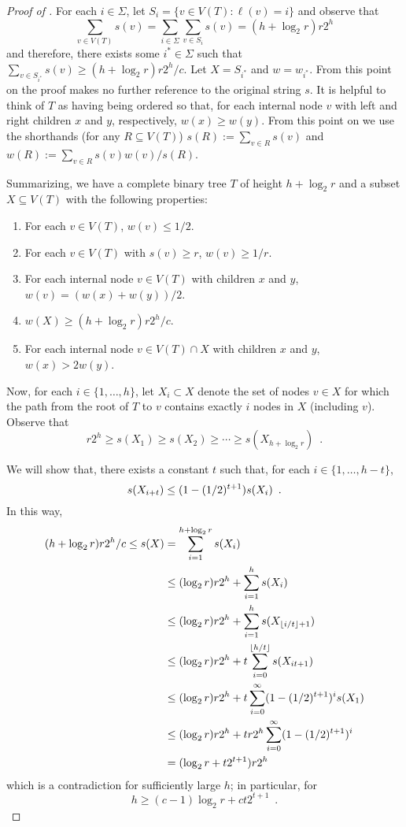 \documentclass{patmorin}
\begin{document}
\begin{proof}[Proof of ]
  For each $i\in\Sigma$, let $S_i=\{v\in V(T): \ell(v)=i\}$ and observe that 
  \[
      \sum_{v\in V(T)}s(v)=\sum_{i\in\Sigma} \sum_{v\in S_i} s(v) = (h+\log_2 r)r2^{h}
  \]
  and therefore, there exists some $i^*\in\Sigma$ such that $\sum_{v\in
  S_{i^*}}s(v)\ge (h+\log_2 r)r2^h/c$.  Let $X=S_{i^*}$ and $w=w_{i^*}$.
  From this point on the proof makes no further reference to the original
  string $s$.  It is helpful to think of $T$ as having being ordered
  so that, for each internal node $v$ with left and right children $x$
  and $y$, respectively, $w(x)\ge w(y)$.  From this point on we use
  the shorthands (for any $R\subseteq V(T)$) $s(R):=\sum_{v\in R}s(v)$
  and $w(R):=\sum_{v\in R}s(v)w(v)/s(R)$.

  Summarizing, we have a complete binary tree $T$ of height $h+\log_2 r$ and
  a subset $X\subseteq V(T)$ with the following properties: 
  \begin{enumerate}
    \item For each $v\in V(T)$, $w(v) \le 1/2$.
    \item For each $v\in V(T)$ with $s(v) \ge r$, $w(v)\ge 1/r$.
    \item For each internal node $v\in V(T)$ with children $x$ and $y$,
       $w(v) = (w(x)+w(y))/2$.
    \item $w(X) \ge (h+\log_2 r)r2^{h}/c$.
     \item For each internal node $v\in V(T)\cap X$ with children $x$ and $y$,
       $w(x) > 2w(y)$.
  \end{enumerate}
  Now, for each $i\in\{1,\ldots,h\}$, let $X_i\subset X$ denote the
  set of nodes $v\in X$ for which the path from the root of $T$ to $v$
  contains exactly $i$ nodes in $X$ (including $v$).  Observe that 
  \[  r2^h \ge s(X_1) \ge s(X_2) \ge \cdots\ge s(X_{h+\log_2 r}) \enspace . \]

  We will show that, there exists a constant $t$ such that, 
  for each $i\in\{1,\ldots,h-t\}$,  
  \begin{equation}
     s(X_{i+t}) \le (1-(1/2)^{t+1}) s(X_i) \enspace . \eqlabel{t}
  \end{equation}
  In this way, 
  \begin{align*}
     (h+\log_2 r)r2^{h}/c 
        \le s(X) & = \sum_{i=1}^{h+\log_2 r} s(X_i) \\
           &\le (\log_2 r)r2^{h}+\sum_{i=1}^{h} s(X_i) \\
           &\le (\log_2 r)r2^{h}+\sum_{i=1}^{h} s(X_{{\lfloor i/t \rfloor}+1}) \\
           &\le (\log_2 r)r2^{h}+t\sum_{i=0}^{{\lfloor h/t \rfloor}} s(X_{it+1}) \\
           &\le (\log_2 r)r2^{h}+t\sum_{i=0}^{\infty} (1-(1/2)^{t+1})^i s(X_1) \\
           &\le (\log_2 r)r2^{h}+tr2^{h}\sum_{i=0}^{\infty} (1-(1/2)^{t+1})^i  \\
           & = (\log_2 r+t2^{t+1})r2^{h} 
  \end{align*}
  which is a contradiction for sufficiently large $h$; in particular, for 
  \[    
        h \ge (c-1)\log_2 r+ ct2^{t+1} \enspace . 
  \]


\end{proof}
\end{document}

